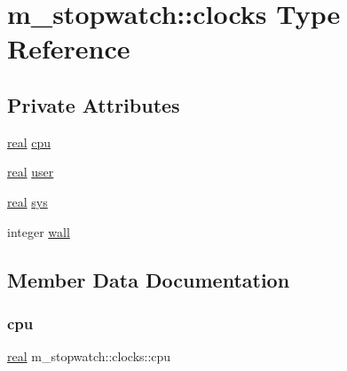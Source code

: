\hypertarget{structm__stopwatch_1_1clocks}{}\section{m\+\_\+stopwatch\+:\+:clocks Type Reference}
\label{structm__stopwatch_1_1clocks}
\subsection*{Private Attributes}
\begin{DoxyCompactItemize}
\item 
\hyperlink{read__watch_83_8txt_abdb62bde002f38ef75f810d3a905a823}{real} \hyperlink{structm__stopwatch_1_1clocks_a9a1b2b546eed6ae3cec4d46c529a32f9}{cpu}
\item 
\hyperlink{read__watch_83_8txt_abdb62bde002f38ef75f810d3a905a823}{real} \hyperlink{structm__stopwatch_1_1clocks_a6734a01073d44a271b14f6c7e266fa61}{user}
\item 
\hyperlink{read__watch_83_8txt_abdb62bde002f38ef75f810d3a905a823}{real} \hyperlink{structm__stopwatch_1_1clocks_a86554366f47cf591953288ad9addea53}{sys}
\item 
integer \hyperlink{structm__stopwatch_1_1clocks_a8c979e58959961744ee85e5f44fbaf64}{wall}
\end{DoxyCompactItemize}


\subsection{Member Data Documentation}
\mbox{\label{structm__stopwatch_1_1clocks_a9a1b2b546eed6ae3cec4d46c529a32f9}} 
\subsubsection{\texorpdfstring{cpu}{cpu}}
{\footnotesize\ttfamily \hyperlink{read__watch_83_8txt_abdb62bde002f38ef75f810d3a905a823}{real} m\+\_\+stopwatch\+::clocks\+::cpu\hspace{0.3cm}{\ttfamily [private]}}

\mbox{\label{structm__stopwatch_1_1clocks_a86554366f47cf591953288ad9addea53}} 
